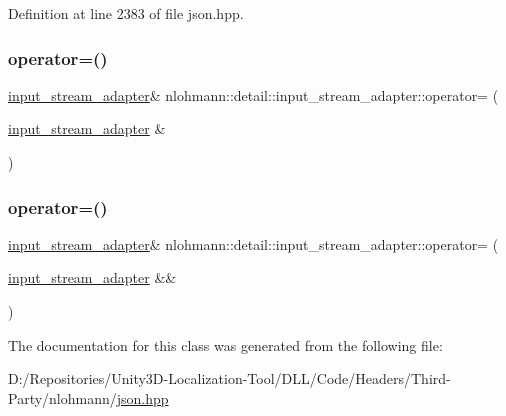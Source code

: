 Definition at line 2383 of file json.\+hpp.

\mbox{\label{classnlohmann_1_1detail_1_1input__stream__adapter_aeac5048221929b8f7558d1698dd0fb3a}} 
\subsubsection{\texorpdfstring{operator=()}{operator=()}\hspace{0.1cm}{\footnotesize\ttfamily [1/2]}}
{\footnotesize\ttfamily \mbox{\hyperlink{classnlohmann_1_1detail_1_1input__stream__adapter}{input\+\_\+stream\+\_\+adapter}}\& nlohmann\+::detail\+::input\+\_\+stream\+\_\+adapter\+::operator= (\begin{DoxyParamCaption}\item[{\mbox{\hyperlink{classnlohmann_1_1detail_1_1input__stream__adapter}{input\+\_\+stream\+\_\+adapter}} \&}]{ }\end{DoxyParamCaption})\hspace{0.3cm}{\ttfamily [delete]}}

\mbox{\label{classnlohmann_1_1detail_1_1input__stream__adapter_a3577dff99cc91968557b52959b0363e4}} 
\subsubsection{\texorpdfstring{operator=()}{operator=()}\hspace{0.1cm}{\footnotesize\ttfamily [2/2]}}
{\footnotesize\ttfamily \mbox{\hyperlink{classnlohmann_1_1detail_1_1input__stream__adapter}{input\+\_\+stream\+\_\+adapter}}\& nlohmann\+::detail\+::input\+\_\+stream\+\_\+adapter\+::operator= (\begin{DoxyParamCaption}\item[{\mbox{\hyperlink{classnlohmann_1_1detail_1_1input__stream__adapter}{input\+\_\+stream\+\_\+adapter}} \&\&}]{ }\end{DoxyParamCaption})\hspace{0.3cm}{\ttfamily [delete]}}



The documentation for this class was generated from the following file\+:\begin{DoxyCompactItemize}
\item 
D\+:/\+Repositories/\+Unity3\+D-\/\+Localization-\/\+Tool/\+D\+L\+L/\+Code/\+Headers/\+Third-\/\+Party/nlohmann/\mbox{\hyperlink{json_8hpp}{json.\+hpp}}\end{DoxyCompactItemize}
